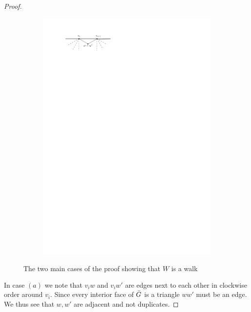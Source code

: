 \begin{proof}
\begin{figure}[h]
\begin{subfigure}[b]{0.5\linewidth}
        \caption{}
    \end{subfigure}%
    \begin{subfigure}[b]{0.5\linewidth}
        \includegraphics[width=\linewidth]{redAlgo/img/walkProofB}
        \vspace{1cm}

        \caption{}
    \end{subfigure}

    	\caption{The two main cases of the proof showing that $W$ is a walk}
	\label{fig:walkproof}
\end{figure}


In case $(a)$ we note that $v_i w$ and $v_i w'$ are edges next to each other in clockwise order around $v_i$. Since every interior face of $\bar{G}$ is a triangle $ww'$ must be an edge. We thus see that $w, w'$ are adjacent and not duplicates.


\end{proof}
